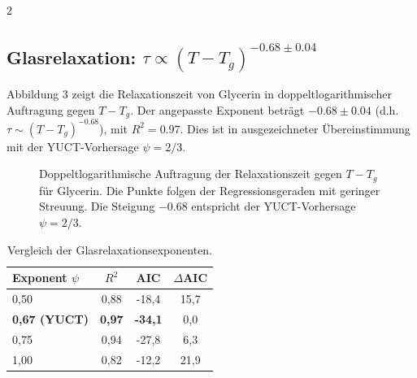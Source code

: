 \documentclass[11pt,a4paper]{article}
\begin{document}
\begin{multicols}{2}
		\subsection{Glasrelaxation: \(\tau \propto (T - T_g)^{-0.68 \pm 0.04}\)}
		
		Abbildung 3 zeigt die Relaxationszeit von Glycerin in doppeltlogarithmischer Auftragung gegen \(T - T_g\). Der angepasste Exponent beträgt \(-0.68 \pm 0.04\) (d.h. \(\tau \sim (T - T_g)^{-0.68}\)), mit \(R^2 = 0.97\). Dies ist in ausgezeichneter Übereinstimmung mit der YUCT-Vorhersage \(\psi = 2/3\).
		
		\begin{figure}[htbp]
			\centering
			\caption{Doppeltlogarithmische Auftragung der Relaxationszeit gegen \(T - T_g\) für Glycerin. Die Punkte folgen der Regressionsgeraden mit geringer Streuung. Die Steigung \(-0.68\) entspricht der YUCT-Vorhersage \(\psi = 2/3\).}
			\label{fig:glass}
		\end{figure}
		
		\begin{table}[htbp]
			\centering
			\caption{Vergleich der Glasrelaxationsexponenten.}
			\label{tab:glass}
			\begin{tabular}{lccc}
				\toprule
				Exponent $\psi$ & $R^2$ & AIC & $\Delta$AIC \\
				\midrule
				0,50 & 0,88 & -18,4 & 15,7 \\
				\textbf{0,67 (YUCT)} & \textbf{0,97} & \textbf{-34,1} & 0,0 \\
				0,75 & 0,94 & -27,8 & 6,3 \\
				1,00 & 0,82 & -12,2 & 21,9 \\
				\bottomrule
			\end{tabular}
		\end{table}
		

\end{multicols}
\end{document}
